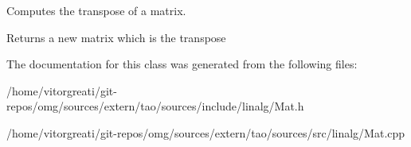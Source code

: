 Computes the transpose of a matrix. 

\begin{DoxyReturn}{Returns}
a new matrix which is the transpose 
\end{DoxyReturn}


The documentation for this class was generated from the following files\+:\begin{DoxyCompactItemize}
\item 
/home/vitorgreati/git-\/repos/omg/sources/extern/tao/sources/include/linalg/Mat.\+h\item 
/home/vitorgreati/git-\/repos/omg/sources/extern/tao/sources/src/linalg/Mat.\+cpp\end{DoxyCompactItemize}
